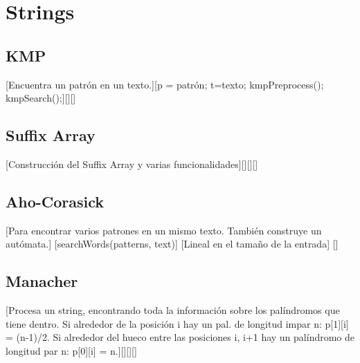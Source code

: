 \chapter{Strings}

\section{KMP}
%
	[Encuentra un patrón en un texto.][p = patrón; t=texto; kmpPreprocess(); kmpSearch();][][]	
	
\section{Suffix Array}
%
[Construcción del Suffix Array y varias funcionalidades][][][]

\section{Aho-Corasick}
%
	[Para encontrar varios patrones en un mismo texto. También construye un autómata.]%
	[searchWords(patterns, text)]%
	[Lineal en el tamaño de la entrada]%
	[]
	
\section{Manacher}
%
	[Procesa un string, encontrando toda la información sobre los palíndromos que tiene dentro. Si alrededor de la posición i hay un pal. de longitud impar n: p[1][i] = (n-1)/2. Si alrededor del hueco entre las posiciones i, i+1 hay un palíndromo de longitud par n: p[0][i] = n.][][][]

	
	
